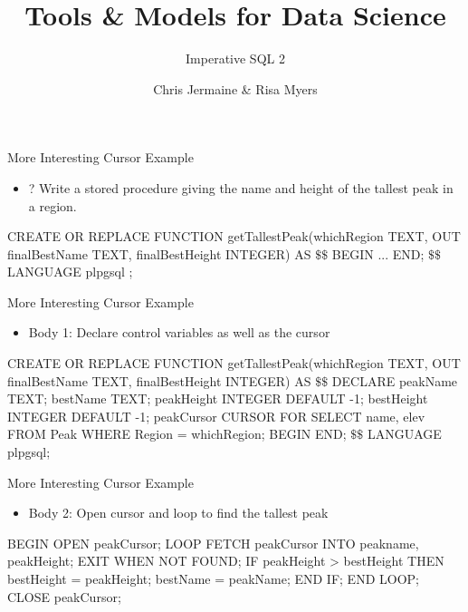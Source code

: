 \documentclass[aspectratio=169]{beamer}
\title[]
{ Tools \& Models for Data Science}
\subtitle{Imperative SQL 2}
\author[]{Chris Jermaine \& Risa Myers}
\institute
{
  Rice University 
}
\date[]{}
\newenvironment{noindentitemize}
{ \begin{itemize}
 \setlength{\itemsep}{1.5ex}
  \setlength{\parsep}{0pt}   
  \setlength{\parskip}{0pt}
 \addtolength{\leftskip}{-2em}
 }
{ \end{itemize} }
\begin{document}
\begin{frame}
 \titlepage
\end{frame}

\begin{frame}[fragile]{More Interesting Cursor Example}

\begin{noindentitemize}
\item[?] Write a stored procedure giving the name and height of the tallest peak in a region.
\end{noindentitemize}

\begin{SQL}
CREATE OR REPLACE FUNCTION  
   getTallestPeak(whichRegion TEXT, 
      OUT finalBestName TEXT, finalBestHeight INTEGER) AS
$\textbf{\$\$}$
BEGIN
...
END;
$\textbf{\$\$}$
LANGUAGE plpgsql ;
\end{SQL}
\end{frame}

\begin{frame}[fragile]{More Interesting Cursor Example}

\begin{noindentitemize}
\item Body 1: Declare control variables as well as the cursor
\end{noindentitemize}

\begin{SQL}
CREATE OR REPLACE FUNCTION  
   getTallestPeak(whichRegion TEXT, 
      OUT finalBestName TEXT, finalBestHeight INTEGER) AS
$\textbf{\$\$}$
DECLARE 
   peakName TEXT;
   bestName TEXT;
   peakHeight INTEGER DEFAULT -1;
   bestHeight INTEGER DEFAULT -1;
   peakCursor CURSOR FOR SELECT name, elev 
	FROM Peak WHERE Region = whichRegion;
BEGIN
END;
$\textbf{\$\$}$
LANGUAGE plpgsql;\end{SQL}
\end{frame}

\begin{frame}[fragile]{More Interesting Cursor Example}

\begin{noindentitemize}
\item Body 2: Open cursor and loop to find the tallest peak
\end{noindentitemize}

\begin{SQL}   
BEGIN
OPEN peakCursor;
LOOP
	FETCH peakCursor INTO peakname, peakHeight;	
	EXIT WHEN NOT FOUND;
	IF peakHeight > bestHeight THEN
		bestHeight = peakHeight;
		bestName = peakName;
	END IF;
END LOOP;
CLOSE peakCursor;
\end{SQL}
\end{frame}
\end{document}
